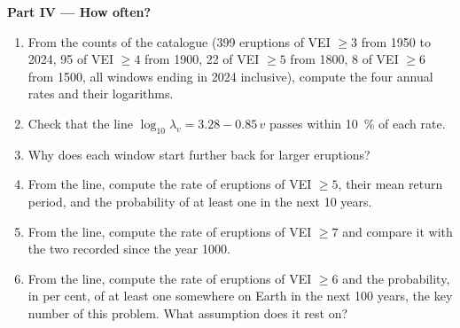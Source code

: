 \begin{problem}
\noindent\textbf{Part IV --- How often?}
\begin{enumerate}[resume]
\item From the counts of the catalogue (399 eruptions of VEI $\ge 3$ from 1950 to
2024, 95 of VEI $\ge 4$ from 1900, 22 of VEI $\ge 5$ from 1800, 8 of VEI $\ge 6$ from
1500, all windows ending in 2024 inclusive), compute the four annual rates and
their logarithms.
\item Check that the line $\log_{10}\lambda_v = 3.28 - 0.85\,v$ passes within
\qty{10}{\percent} of each rate.
\item Why does each window start further back for larger eruptions?
\item From the line, compute the rate of eruptions of VEI $\ge 5$, their mean
return period, and the probability of at least one in the next 10 years.
\item From the line, compute the rate of eruptions of VEI $\ge 7$ and compare it
with the two recorded since the year 1000.
\item From the line, compute the rate of eruptions of VEI $\ge 6$ and the
probability, in per cent, of at least one somewhere on Earth in the next 100
years, the key number of this problem. What assumption does it rest on?
\end{enumerate}
\end{problem}

